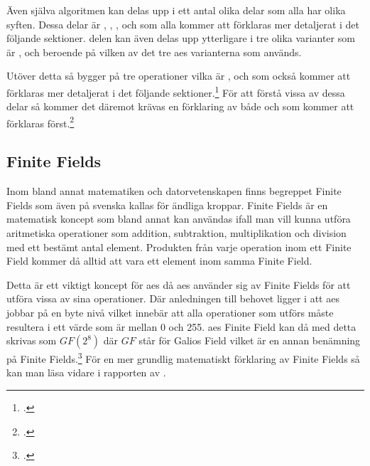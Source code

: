 Även själva algoritmen kan delas upp i ett antal olika delar som alla har olika syften. Dessa delar är , , ,
 och  som alla kommer att förklaras mer detaljerat i det följande sektioner.  delen kan även
delas upp ytterligare i tre olika varianter som är ,  och  beroende
på vilken av det tre \acrshort{aes} varianterna som används.

Utöver detta så bygger  på tre operationer vilka är ,  och
 som också kommer att förklaras mer detaljerat i det följande sektioner.\footcite{aes_wiki} För att förstå vissa av dessa delar
så kommer det däremot krävas en förklaring av både  och  som kommer att förklaras först.\footcite{daemen1999aes}

\subsection{Finite Fields}
\label{sec:finite-fields}
Inom bland annat matematiken och datorvetenskapen finns begreppet Finite Fields
som även på svenska kallas för ändliga kroppar. Finite Fields är en matematisk
koncept som bland annat kan användas ifall man vill kunna utföra aritmetiska
operationer som addition, subtraktion, multiplikation och division med ett
bestämt antal element. Produkten från varje operation inom ett Finite Field
kommer då alltid att vara ett element inom samma Finite Field.

Detta är ett viktigt koncept för \acrshort{aes} då \acrshort{aes} använder sig av
Finite Fields för att utföra vissa av sina operationer. Där anledningen till behovet
ligger i att \acrshort{aes} jobbar på en byte nivå vilket innebär att alla operationer
som utförs måste resultera i ett värde som är mellan 0 och 255. \acrshort{aes} Finite Field
kan då med detta skrivas som $GF(2^8)$ där $GF$ står för Galios Field vilket är
en annan benämning på Finite Fields.\footcite{finitefield_wiki} För en mer grundlig matematiskt förklaring av Finite Fields så kan man läsa vidare i rapporten
 av \citeauthor{boman2016andliga}.

